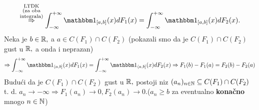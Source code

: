 \documentclass{article}
\begin{document}
\[\overset{\substack{\text{LTDK}\\\text{(za oba}\\\text{integrala)}}}{\Rightarrow}\int_{-\infty}^{+\infty}\mathbbm 1_{[a,b]}(x)dF_1(x)=\int_{-\infty}^{+\infty}\mathbbm 1_{[a,b]}(x)dF_2(x).\] Neka je \(b\in\Bbb R,\) a \(a\in C(F_1)\cap C(F_2)\) (pokazali smo da je \(C(F_1)\cap C(F_2)\) gust u \(\Bbb R,\) a onda i neprazan) \[\Rightarrow \int_{-\infty}^{+\infty}\mathbbm 1_{\langle a,b]}(x)dF_1(x)=\int_{-\infty}^{+\infty}\mathbbm 1_{\langle a,b]}(x)dF_2(x)\Rightarrow F_1(b)-F_1(a)=F_2(b)-F_2(a)\] Budući da je \(C(F_1)\cap C(F_2)\) gust u \(\Bbb R,\) postoji niz \((a_n)_{n\in\Bbb N}\subseteq C(F_1)\cap C(F_2)\) t. d. \(a_n\to-\infty\)\newline\(\Rightarrow F_1(a_n)\to 0,F_2(a_n)\to 0.\)\newline (\(a_n\ge b\) za eventualno \textbf{konačno} mnogo \(n\in\Bbb N\))\newline\newline
\end{document}
